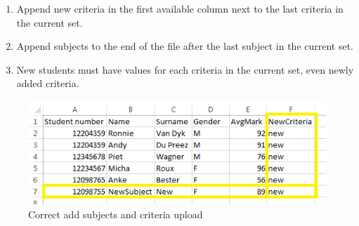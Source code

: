\begin{enumerate}
\begin{itemize}
\begin{enumerate}
\begin{enumerate}
		\item Append new criteria in the first available column next to the last criteria in the current set.
		\item Append subjects to the end of the file after the last subject in the current set.
		\item New students must have values for each criteria in the current set, even newly added criteria.
	\end{enumerate}
\end{enumerate}
	\begin{figure}[H] 
	\centering
	\includegraphics[width=13cm]{./graphics/AddSubCrit.png}\par
	\caption{Correct add subjects and criteria upload}
	\end{figure}

\end{itemize}
\end{enumerate}


